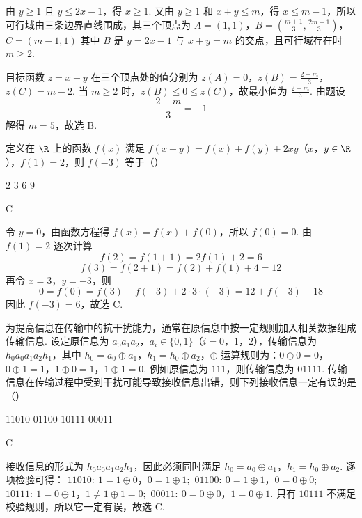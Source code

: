 \begin{solution}
由 \(y\geqslant1\) 且 \(y\leqslant2x-1\)，得 \(x\geqslant1\). 又由 \(y\geqslant1\) 和 \(x+y\leqslant m\)，得 \(x\leqslant m-1\)，所以可行域由三条边界直线围成，其三个顶点为
\(A=(1,1)\)，\(B=\left(\frac{m+1}{3},\frac{2m-1}{3}\right)\)，\(C=(m-1,1)\)
其中 \(B\) 是 \(y=2x-1\) 与 \(x+y=m\) 的交点，且可行域存在时 \(m\geqslant2\).

目标函数 \(z=x-y\) 在三个顶点处的值分别为
\(z(A)=0\)，\(z(B)=\frac{2-m}{3}\)，\(z(C)=m-2\).
当 \(m\geqslant2\) 时，\(z(B)\leqslant0\leqslant z(C)\)，故最小值为 \(\frac{2-m}{3}\). 由题设
\[
\frac{2-m}{3}=-1
\]
解得 \(m=5\)，故选 B.
\end{solution}

\begin{problem}
定义在 \(\R\) 上的函数 \(f(x)\) 满足 \(f(x + y) = f(x) + f(y) + 2xy\)（\(x\)，\(y \in \R\)），\(f(1) = 2\)，则 \(f(-3)\) 等于（\quad）

\choices
    {\(2\)}
    {\(3\)}
    {\(6\)}
    {\(9\)}
\end{problem}

\begin{answer}
C
\end{answer}

\begin{solution}
令 \(y=0\)，由函数方程得 \(f(x)=f(x)+f(0)\)，所以 \(f(0)=0\). 由 \(f(1)=2\) 逐次计算
\[
f(2)=f(1+1)=2f(1)+2=6
\]
\[
f(3)=f(2+1)=f(2)+f(1)+4=12
\]
再令 \(x=3\)，\(y=-3\)，则
\[
0=f(0)=f(3)+f(-3)+2\cdot3\cdot(-3)=12+f(-3)-18
\]
因此 \(f(-3)=6\)，故选 C.
\end{solution}

\begin{problem}
为提高信息在传输中的抗干扰能力，通常在原信息中按一定规则加入相关数据组成传输信息. 设定原信息为 \(a_0a_1a_2\)，\(a_i \in \{0, 1\}\)（\(i = 0\)，\(1\)，\(2\)），传输信息为 \(h_0a_0a_1a_2h_1\)，其中 \(h_0 = a_0 \oplus a_1\)，\(h_1 = h_0 \oplus a_2\)，\(\oplus\) 运算规则为：\(0 \oplus 0 = 0\)，\(0 \oplus 1 = 1\)，\(1 \oplus 0 = 1\)，\(1 \oplus 1 = 0\). 例如原信息为 \(111\)，则传输信息为 \(01111\). 传输信息在传输过程中受到干扰可能导致接收信息出错，则下列接收信息一定有误的是（\quad）

\choices
    {\(11010\)}
    {\(01100\)}
    {\(10111\)}
    {\(00011\)}
\end{problem}

\begin{answer}
C
\end{answer}

\begin{solution}
接收信息的形式为 \(h_0a_0a_1a_2h_1\)，因此必须同时满足
\(h_0=a_0\oplus a_1\)，\(h_1=h_0\oplus a_2\).
逐项检验可得：
\(11010:\ 1=1\oplus0\)，\(0=1\oplus1;\)
\(01100:\ 0=1\oplus1\)，\(0=0\oplus0;\)
\(10111:\ 1=0\oplus1\)，\(1\neq1\oplus1=0;\)
\(00011:\ 0=0\oplus0\)，\(1=0\oplus1\).
只有 \(10111\) 不满足校验规则，所以它一定有误，故选 C.
\end{solution}

